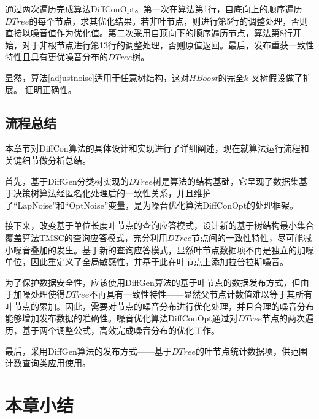 通过两次遍历完成算法DiffConOpt。第一次在算法第1行，自底向上的顺序遍历$DTree$的每个节点，求其优化结果。若非叶节点，则进行第5行的调整处理，否则直接以噪音值作为优化值。第二次采用自顶向下的顺序遍历节点，算法第8行开始，对于非根节点进行第13行的调整处理，否则原值返回。最后，发布重获一致性特性且具有更优噪音分布的$DTree$树。

显然，算法\ref{adjustnoise}适用于任意树结构，这对$HBoost$的完全$k$-叉树假设做了扩展。
证明正确性。


\subsection{流程总结}

本章节对DiffCon算法的具体设计和实现进行了详细阐述，现在就算法运行流程和关键细节做分析总结。

首先，基于DiffGen分类树实现的$DTree$树是算法的结构基础，它呈现了数据集基于决策树算法经匿名化处理后的一致性关系，并且维护了“LapNoise”和“OptNoise”变量，是为噪音优化算法DiffConOpt的处理框架。

接下来，改变基于单位长度叶节点的查询应答模式，设计新的基于树结构最小集合覆盖算法TMSC的查询应答模式，充分利用$DTree$节点间的一致性特性，尽可能减小噪音叠加的发生。基于新的查询应答模式，显然叶节点数据项不再是独立的加噪单位，因此重定义了全局敏感性，并基于此在叶节点上添加拉普拉斯噪音。

为了保护数据安全性，应该使用DiffGen算法的基于叶节点的数据发布方式，但由于加噪处理使得$DTree$不再具有一致性特性——显然父节点计数值难以等于其所有叶节点的累加。因此，需要对节点的噪音分布进行优化处理，并且合理的噪音分布能够增加发布数据的准确性。噪音优化算法DiffConOpt通过对$DTree$节点的两次遍历，基于两个调整公式，高效完成噪音分布的优化工作。

最后，采用DiffGen算法的发布方式——基于$DTree$的叶节点统计数据项，供范围计数查询类应用使用。

\section{本章小结}